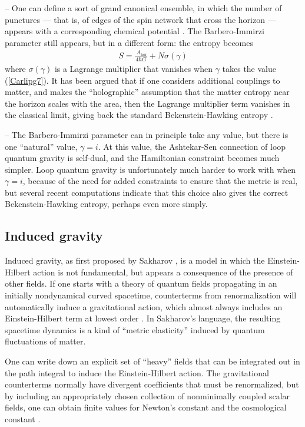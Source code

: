 \documentclass[11pt]{article}
\begin{document}
-- One can define a sort of grand canonical ensemble, in which
the number of punctures --- that is, of edges of the spin network 
that cross the horizon --- appears with a corresponding chemical 
potential \cite{Ghosh}.  The Barbero-Immirzi parameter still appears, 
but in a different form: the entropy becomes
\begin{align}
S =  \frac{\ A_{\mathrm{\scriptstyle hor}}}{4\hbar G}  + N\sigma(\gamma)
\label{Carlipg8}
\end{align}
where $\sigma(\gamma)$ is  a Lagrange multiplier that vanishes when
$\gamma$ takes the value (\ref{Carlipg7}).  It has been argued that if
one considers additional couplings to matter, and makes the
``holographic'' assumption that the matter entropy near the horizon 
scales with the area, then the Lagrange multiplier term vanishes in
the classical limit, giving back the standard Bekenstein-Hawking 
entropy \cite{Perez}.

-- The Barbero-Immirzi parameter can in principle take any value,
but there is one ``natural'' value, $\gamma=i$.  At this value, the
Ashtekar-Sen connection of loop quantum gravity is self-dual,
and the Hamiltonian constraint becomes much simpler.  Loop quantum
gravity is unfortunately much harder to work with when $\gamma=i$,
because of the need for added constraints to ensure that the metric
is real, but several recent computations \cite{Geiller,Achour,Carlip_loop}
indicate that this choice also gives the correct Bekenstein-Hawking
entropy, perhaps even more simply.

\subsection{Induced gravity}

Induced gravity, as first proposed by Sakharov \cite{Sakharov},
is a model in which the Einstein-Hilbert action is not fundamental,
but appears a consequence of the presence of other fields.  If one starts with 
a theory of quantum fields propagating in an initially nondynamical
curved spacetime, counterterms from renormalization will automatically 
induce a gravitational action, which almost always includes an 
Einstein-Hilbert term at lowest order \cite{Adler}.  In Sakharov's
language, the resulting spacetime dynamics is a kind of 
``metric elasticity'' induced by quantum fluctuations of matter.

One can write down an explicit set of ``heavy'' fields that 
can be integrated out in the path integral to induce the Einstein-Hilbert 
action.  The gravitational counterterms normally have divergent
coefficients that must be renormalized, but by including an
appropriately chosen collection of nonminimally coupled scalar fields, 
one can obtain finite values for Newton's constant and the 
cosmological constant \cite{Frolovx}.  
\end{document}

